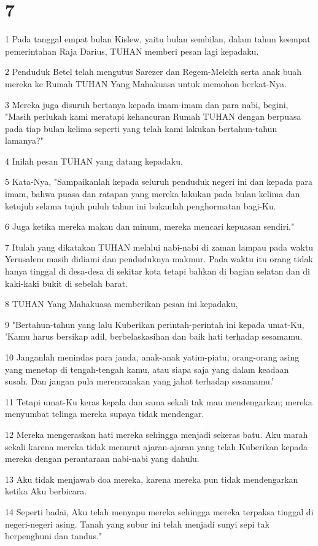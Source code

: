 \chapter{7}

\par 1 Pada tanggal empat bulan Kislew, yaitu bulan sembilan, dalam tahun keempat pemerintahan Raja Darius, TUHAN memberi pesan lagi kepadaku.
\par 2 Penduduk Betel telah mengutus Sarezer dan Regem-Melekh serta anak buah mereka ke Rumah TUHAN Yang Mahakuasa untuk memohon berkat-Nya.
\par 3 Mereka juga disuruh bertanya kepada imam-imam dan para nabi, begini, "Masih perlukah kami meratapi kehancuran Rumah TUHAN dengan berpuasa pada tiap bulan kelima seperti yang telah kami lakukan bertahun-tahun lamanya?"
\par 4 Inilah pesan TUHAN yang datang kepadaku.
\par 5 Kata-Nya, "Sampaikanlah kepada seluruh penduduk negeri ini dan kepada para imam, bahwa puasa dan ratapan yang mereka lakukan pada bulan kelima dan ketujuh selama tujuh puluh tahun ini bukanlah penghormatan bagi-Ku.
\par 6 Juga ketika mereka makan dan minum, mereka mencari kepuasan sendiri."
\par 7 Itulah yang dikatakan TUHAN melalui nabi-nabi di zaman lampau pada waktu Yerusalem masih didiami dan penduduknya makmur. Pada waktu itu orang tidak hanya tinggal di desa-desa di sekitar kota tetapi bahkan di bagian selatan dan di kaki-kaki bukit di sebelah barat.
\par 8 TUHAN Yang Mahakuasa memberikan pesan ini kepadaku,
\par 9 "Bertahun-tahun yang lalu Kuberikan perintah-perintah ini kepada umat-Ku, 'Kamu harus bersikap adil, berbelaskasihan dan baik hati terhadap sesamamu.
\par 10 Janganlah menindas para janda, anak-anak yatim-piatu, orang-orang asing yang menetap di tengah-tengah kamu, atau siapa saja yang dalam keadaan susah. Dan jangan pula merencanakan yang jahat terhadap sesamamu.'
\par 11 Tetapi umat-Ku keras kepala dan sama sekali tak mau mendengarkan; mereka menyumbat telinga mereka supaya tidak mendengar.
\par 12 Mereka mengeraskan hati mereka sehingga menjadi sekeras batu. Aku marah sekali karena mereka tidak menurut ajaran-ajaran yang telah Kuberikan kepada mereka dengan perantaraan nabi-nabi yang dahulu.
\par 13 Aku tidak menjawab doa mereka, karena mereka pun tidak mendengarkan ketika Aku berbicara.
\par 14 Seperti badai, Aku telah menyapu mereka sehingga mereka terpaksa tinggal di negeri-negeri asing. Tanah yang subur ini telah menjadi sunyi sepi tak berpenghuni dan tandus."

